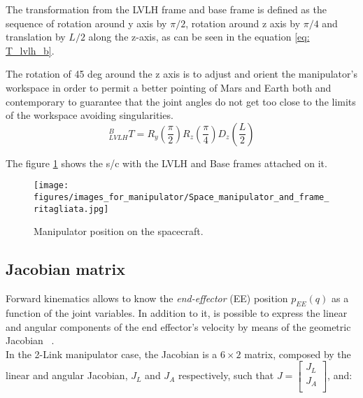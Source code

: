 \documentclass[main.tex]{subfiles}
\begin{document}
The transformation from the LVLH frame and base frame is defined as the sequence of rotation around y axis by $\pi/2$, rotation around z axis by $\pi/4$ and translation by $L/2$ along the z-axis, as can be seen in the equation \ref{eq: T_lvlh_b}.\

The rotation of 45 deg around the z axis is to adjust and orient the manipulator's workspace in order to permit a better pointing of Mars and Earth both and contemporary to guarantee that the joint angles do not get too close to the limits of the workspace avoiding singularities.
\begin{equation}
  ^{B}_{LVLH}T = R_{y}\left(\dfrac{\pi}{2}\right) R_{z}\left(\dfrac{\pi}{4}\right) D_{z}\left(\dfrac{L}{2}\right)  
  \label{eq: T_lvlh_b}
\end{equation}

The figure \ref{fig:space_manipulator} shows the s/c with the LVLH and Base frames attached on it.

\begin{figure}[!ht]
    \centering
        \texttt{[image: figures/images\_for\_manipulator/Space\_manipulator\_and\_frame\_ritagliata.jpg]}
        \caption{Manipulator position on the spacecraft.}
        \label{fig:space_manipulator}
\end{figure}

\subsection{Jacobian matrix}
Forward kinematics allows to know the \textit{end-effector} (EE) position $p_{EE}(q)$ as a function of the joint variables. In addition to it, is possible to express the linear and angular components of the end effector's velocity by means of the geometric Jacobian ~. \\In the 2-Link manipulator case, the Jacobian is a $6\times{2}$ matrix, composed by the linear and angular Jacobian, $J_L$ and $J_A$ respectively, such that 
$J = \begin{bmatrix}
J_L\\
J_A\\
\end{bmatrix}$, and:
\end{document}
